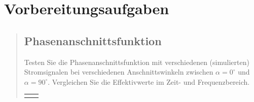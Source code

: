 %     




\section{Vorbereitungsaufgaben}
\begin{quote}
    \hspace{-2em}
    \subsection{Phasenanschnittsfunktion}
    Testen Sie die Phasenanschnittsfunktion mit verschiedenen (simulierten) Stromsignalen bei verschiedenen Anschnittswinkeln
    zwischen $\alpha = 0^{\circ}$ und $\alpha = 90^{\circ}$. Vergleichen Sie die Effektivwerte im Zeit- und Frequenzbereich.

        \begin{center}
        \begin{tabular}{ll}
        
        \hspace{-2.5cm}
            \begin{minipage}{0.6\textwidth}
                

\end{minipage}
\end{tabular}
\end{center}
\end{quote}
